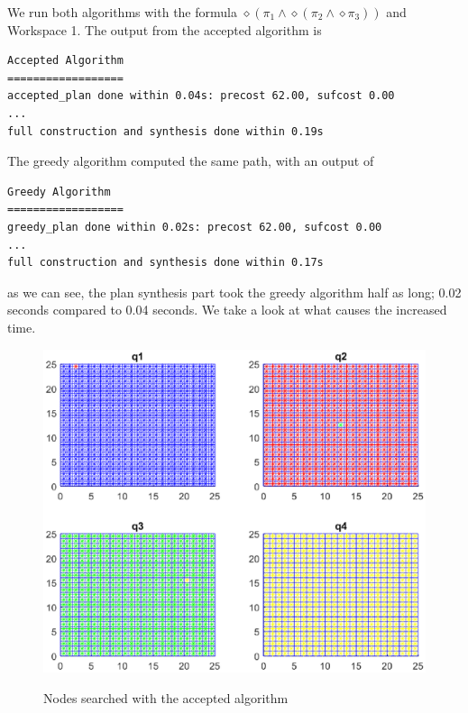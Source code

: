 We run both algorithms with the formula $\diamond (\pi_1 \land \diamond(\pi_2 \land \diamond \pi_3))$ and Workspace 1. The output from the accepted algorithm is

\begin{minipage}{\textwidth}
\begingroup
\fontsize{9pt}{12pt}\selectfont
\begin{lstlisting}
Accepted Algorithm
==================
accepted_plan done within 0.04s: precost 62.00, sufcost 0.00
...
full construction and synthesis done within 0.19s 
\end{lstlisting}
\endgroup
\end{minipage}

The greedy algorithm computed the same path, with an output of

\begingroup
\fontsize{9pt}{12pt}\selectfont
\begin{lstlisting}
Greedy Algorithm
==================
greedy_plan done within 0.02s: precost 62.00, sufcost 0.00
...
full construction and synthesis done within 0.17s 
\end{lstlisting}
\endgroup
as we can see, the plan synthesis part took the greedy algorithm half as long; 0.02 seconds compared to 0.04 seconds. We take a look at what causes the increased time. 

\begin{figure}[!htb]
\centering
\includegraphics[scale=0.9]{acceptedPlot}
\label{fig:animAccept}
\caption{Nodes searched with the accepted algorithm}
\end{figure}

